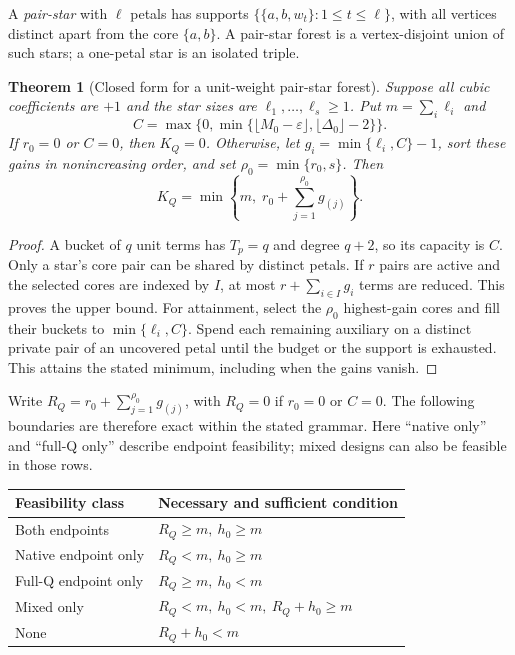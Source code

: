 \documentclass[a4paper,onecolumn,11pt,unpublished]{quantumarticle}
\newtheorem{theorem}[theorem]{Theorem}
\theoremstyle{remark}
\begin{document}
A \emph{pair-star} with $\ell$ petals has supports
$\{\{a,b,w_t\}:1\leq t\leq\ell\}$, with all vertices distinct apart from
the core $\{a,b\}$. A pair-star forest is a vertex-disjoint union of such
stars; a one-petal star is an isolated triple.

\begin{theorem}[Closed form for a unit-weight pair-star forest]
\label{thm:pair-star-capacity}
Suppose all cubic coefficients are $+1$ and the star sizes are
$\ell_1,\ldots,\ell_s\geq1$. Put $m=\sum_i\ell_i$ and
\[
 C=\max\{0,\min\{\lfloor M_0-\varepsilon\rfloor,
                         \lfloor\Delta_0\rfloor-2\}\}.
\]
If $r_0=0$ or $C=0$, then $K_Q=0$. Otherwise, let
$g_i=\min\{\ell_i,C\}-1$, sort these gains in nonincreasing order,
and set $\rho_0=\min\{r_0,s\}$. Then
\begin{equation}
 K_Q=\min\left\{m,\;r_0+\sum_{j=1}^{\rho_0}g_{(j)}\right\}.
 \label{eq:pair-star-capacity}
\end{equation}
\end{theorem}
\begin{proof}
A bucket of $q$ unit terms has $T_p=q$ and degree $q+2$, so its capacity is
$C$. Only a star's core pair can be shared by distinct petals. If $r$ pairs
are active and the selected cores are indexed by $I$, at most
$r+\sum_{i\in I}g_i$ terms are reduced. This proves the upper bound.
For attainment, select the $\rho_0$ highest-gain cores and fill their buckets
to $\min\{\ell_i,C\}$. Spend each remaining auxiliary on a distinct private
pair of an uncovered petal until the budget or the support is exhausted.
This attains the stated minimum, including when the gains vanish.
\end{proof}

Write $R_Q=r_0+\sum_{j=1}^{\rho_0}g_{(j)}$, with $R_Q=0$ if $r_0=0$ or
$C=0$. The following boundaries are therefore exact within the stated grammar.
Here ``native only'' and ``full-Q only'' describe endpoint feasibility;
mixed designs can also be feasible in those rows.
\begin{center}
\begin{tabular}{ll}
\toprule
Feasibility class & Necessary and sufficient condition\\
\midrule
Both endpoints & $R_Q\geq m,\ h_0\geq m$\\
Native endpoint only & $R_Q<m,\ h_0\geq m$\\
Full-Q endpoint only & $R_Q\geq m,\ h_0<m$\\
Mixed only & $R_Q<m,\ h_0<m,\ R_Q+h_0\geq m$\\
None & $R_Q+h_0<m$\\
\bottomrule
\end{tabular}
\end{center}
\end{document}
